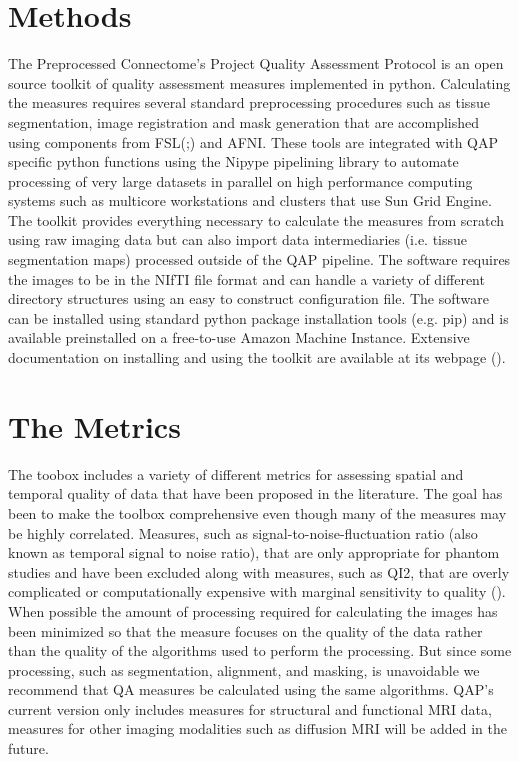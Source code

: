 \documentclass{frontiersSCNS} %
\begin{document}
\section{Methods}
\label{sec:1}
The Preprocessed Connectome’s Project Quality Assessment Protocol is an open source toolkit of quality assessment measures implemented in python. Calculating the measures requires several standard preprocessing procedures such as tissue segmentation, image registration and mask generation that are accomplished using components from FSL(;) and AFNI. These tools are integrated with QAP specific python functions using the Nipype pipelining library to automate processing of very large datasets in parallel on high performance computing systems such as multicore workstations and clusters that use Sun Grid Engine. The toolkit provides everything necessary to calculate the measures from scratch using raw imaging data but can also import data intermediaries (i.e. tissue segmentation maps) processed outside of the QAP pipeline. The software requires the images to be in the NIfTI file format and can handle a variety of different directory structures using an easy to construct configuration file. The software can be installed using standard python package installation tools (e.g. pip) and is available preinstalled on a free-to-use Amazon Machine Instance. Extensive documentation on installing and using the toolkit are available at its webpage ().
\section{The Metrics}
\label{sec:2}
The toobox includes a variety of different metrics for assessing spatial and temporal quality of data that have been proposed in the literature. The goal has been to make the toolbox comprehensive even though many of the measures may be highly correlated. Measures, such as signal-to-noise-fluctuation ratio (also known as temporal signal to noise ratio), that are only appropriate for phantom studies and have been excluded along with measures, such as QI2, that are overly complicated or computationally expensive with marginal sensitivity to quality (). When possible the amount of processing required for calculating the images has been minimized so that the measure focuses on the quality of the data rather than the quality of the algorithms used to perform the processing. But since some processing, such as segmentation, alignment, and masking, is unavoidable we recommend that QA measures be calculated using the same algorithms. QAP’s current version only includes measures for structural and functional MRI data, measures for other imaging modalities such as diffusion MRI will be added in the future.
\end{document}
